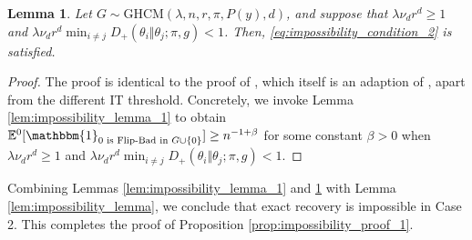\documentclass{article}
\newcommand{\E}{\mathbb{E}}
\newcommand{\1}{\mathbbm{1}}
\theoremstyle{definition}
\theoremstyle{plain}
\newtheorem{lemma}{Lemma}
\begin{document}
\begin{lemma}
\label{lem:impossibility_lemma_2}
    Let $G \sim \text{GHCM}(\lambda, n, r, \pi, P(y), d)$, and suppose that $\lambda \nu_d r^d \geq 1$ and $\lambda \nu_d r^d \min_{i \neq j} D_+(\theta_i \Vert \theta_j; \pi, g) < 1$. Then, \eqref{eq:impossibility_condition_2} is satisfied.
\end{lemma}
\begin{proof}
The proof is identical to the proof of \cite[Lemma 13]{GaudioJin2025}, which itself is an adaption of \cite[Lemma B.5]{Gaudio+2025}, apart from the different IT threshold. Concretely, we invoke Lemma \ref{lem:impossibility_lemma_1} to obtain $\E^0[\1_{0 \text{ is Flip-Bad in } G \cup \{0\}}] \geq n^{-1 + \beta}$ for some constant $\beta > 0$ when $\lambda \nu_d r^d \geq 1$ and $\lambda \nu_d r^d \min_{i \neq j} D_+(\theta_i \Vert \theta_j; \pi, g) < 1$.
\end{proof}


Combining Lemmas \ref{lem:impossibility_lemma_1} and \ref{lem:impossibility_lemma_2} with Lemma \ref{lem:impossibility_lemma}, we conclude that exact recovery is impossible in Case 2. This completes the proof of Proposition \ref{prop:impossibility_proof_1}.
\end{document}
